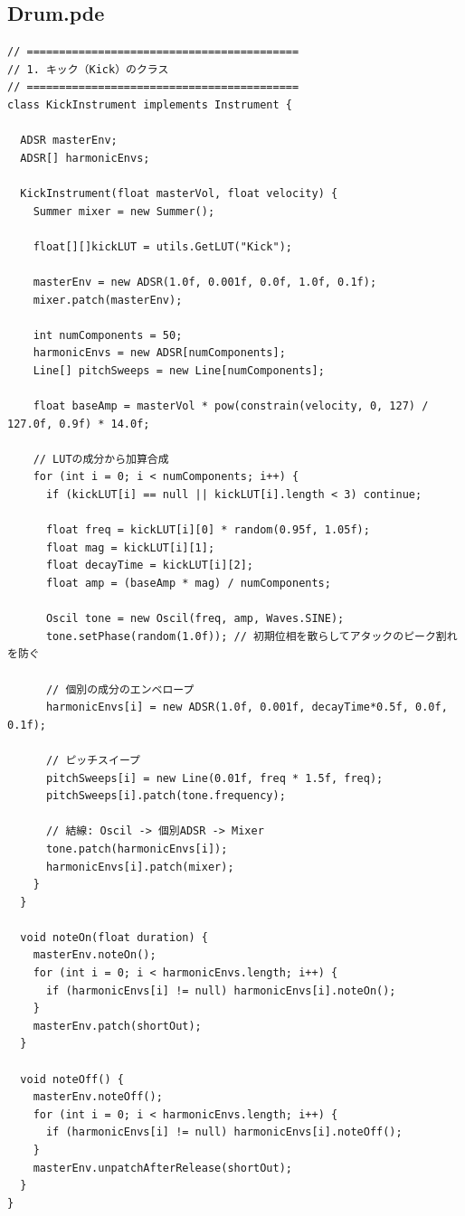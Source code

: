 \subsection{Drum.pde}
\begin{lstlisting}[caption={Drum.pde}, label={lst:proc_drum}]
// ==========================================
// 1. キック（Kick）のクラス
// ==========================================
class KickInstrument implements Instrument {
  
  ADSR masterEnv;
  ADSR[] harmonicEnvs;

  KickInstrument(float masterVol, float velocity) {
    Summer mixer = new Summer();
    
    float[][]kickLUT = utils.GetLUT("Kick");
    
    masterEnv = new ADSR(1.0f, 0.001f, 0.0f, 1.0f, 0.1f);
    mixer.patch(masterEnv);
    
    int numComponents = 50;
    harmonicEnvs = new ADSR[numComponents];
    Line[] pitchSweeps = new Line[numComponents];
    
    float baseAmp = masterVol * pow(constrain(velocity, 0, 127) / 127.0f, 0.9f) * 14.0f;

    // LUTの成分から加算合成
    for (int i = 0; i < numComponents; i++) {
      if (kickLUT[i] == null || kickLUT[i].length < 3) continue;
      
      float freq = kickLUT[i][0] * random(0.95f, 1.05f);
      float mag = kickLUT[i][1];
      float decayTime = kickLUT[i][2];
      float amp = (baseAmp * mag) / numComponents;
      
      Oscil tone = new Oscil(freq, amp, Waves.SINE);
      tone.setPhase(random(1.0f)); // 初期位相を散らしてアタックのピーク割れを防ぐ
      
      // 個別の成分のエンベロープ
      harmonicEnvs[i] = new ADSR(1.0f, 0.001f, decayTime*0.5f, 0.0f, 0.1f);
      
      // ピッチスイープ
      pitchSweeps[i] = new Line(0.01f, freq * 1.5f, freq);
      pitchSweeps[i].patch(tone.frequency);
      
      // 結線: Oscil -> 個別ADSR -> Mixer
      tone.patch(harmonicEnvs[i]);
      harmonicEnvs[i].patch(mixer);
    }
  }

  void noteOn(float duration) {
    masterEnv.noteOn();
    for (int i = 0; i < harmonicEnvs.length; i++) {
      if (harmonicEnvs[i] != null) harmonicEnvs[i].noteOn();
    }
    masterEnv.patch(shortOut);
  }

  void noteOff() {
    masterEnv.noteOff();
    for (int i = 0; i < harmonicEnvs.length; i++) {
      if (harmonicEnvs[i] != null) harmonicEnvs[i].noteOff();
    }
    masterEnv.unpatchAfterRelease(shortOut);
  }
}






\end{lstlisting}
